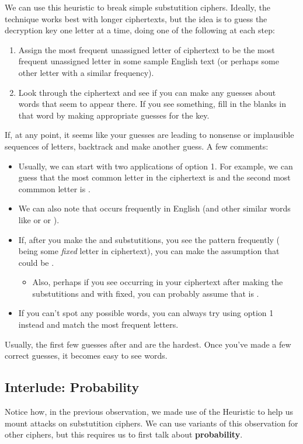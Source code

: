 \documentclass[letterpaper]{article}
\newcommand{\0}{\mathbf{0}}
\begin{document}
We can use this heuristic to break simple substutition ciphers. Ideally, the technique works best with longer ciphertexts, but the idea is to guess the decryption key one letter at a time, doing one of the following at each step: 
\begin{enumerate}
    \item Assign the most frequent unassigned letter of ciphertext to be the most frequent unassigned letter in some sample English text (or perhaps some other letter with a similar frequency).
    \item Look through the ciphertext and see if you can make any guesses about words that seem to appear there. If you see something, fill in the blanks in that word by making appropriate guesses for the key.
\end{enumerate}
If, at any point, it seems like your guesses are leading to nonsense or implausible sequences of letters, backtrack and make another guess. A few comments: 
\begin{itemize}
    \item Usually, we can start with two applications of option 1. For example, we can guess that the most common letter in the ciphertext is  and the second most commmon letter is . 
    \item We can also note that  occurs frequently in English (and other similar words like  or  or ). 
    \item If, after you make the  and  substutitions, you see the  pattern frequently (\code{*} being some \emph{fixed} letter in ciphertext), you can make the assumption that \code{*} could be . 
    \begin{itemize}
        \item Also, perhaps if you see  occurring in your ciphertext after making the substutitions and with \code{*} fixed, you can probably assume that \code{*} is . 
    \end{itemize}

    \item If you can't spot any possible words, you can always try using option 1 instead and match the most frequent letters. 
\end{itemize}
Usually, the first few guesses after  and  are the hardest. Once you've made a few correct guesses, it becomes easy to see words.

\subsection{Interlude: Probability}
Notice how, in the previous observation, we made use of the Heuristic to help us mount attacks on substutition ciphers. We can use variants of this observation for other ciphers, but this requires us to first talk about \textbf{probability}.
\end{document}
